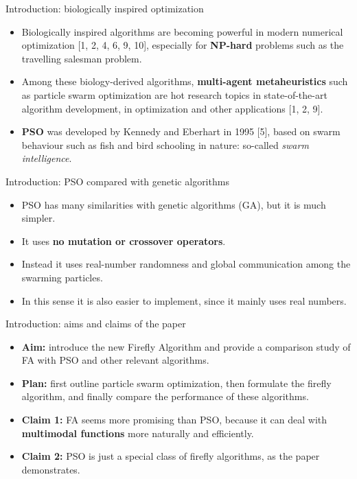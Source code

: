 \documentclass[aspectratio=169,11pt]{beamer}
\newcommand{\hdr}[1]{\gdef\curhdr{#1}}
\gdef\curhdr{}
\begin{document}
\hdr{1 Introduction}
\begin{frame}[t]{Introduction: biologically inspired optimization}
\begin{itemize}\itemsep0.7em
  \item Biologically inspired algorithms are becoming powerful in modern numerical optimization [1, 2, 4, 6, 9, 10], especially for \textbf{NP-hard} problems such as the travelling salesman problem.
  \item Among these biology-derived algorithms, \textbf{multi-agent metaheuristics} such as particle swarm optimization are hot research topics in state-of-the-art algorithm development, in optimization and other applications [1, 2, 9].
  \item \textbf{PSO} was developed by Kennedy and Eberhart in 1995 [5], based on swarm behaviour such as fish and bird schooling in nature: so-called \emph{swarm intelligence}.
\end{itemize}
\end{frame}

\begin{frame}[t]{Introduction: PSO compared with genetic algorithms}
\begin{itemize}\itemsep0.7em
  \item PSO has many similarities with genetic algorithms (GA), but it is much simpler.
  \item It uses \textbf{no mutation or crossover operators}.
  \item Instead it uses real-number randomness and global communication among the swarming particles.
  \item In this sense it is also easier to implement, since it mainly uses real numbers.
\end{itemize}
\end{frame}

\begin{frame}[t]{Introduction: aims and claims of the paper}
\begin{itemize}\itemsep0.7em
  \item \textbf{Aim:} introduce the new Firefly Algorithm and provide a comparison study of FA with PSO and other relevant algorithms.
  \item \textbf{Plan:} first outline particle swarm optimization, then formulate the firefly algorithm, and finally compare the performance of these algorithms.
  \item \textbf{Claim 1:} FA seems more promising than PSO, because it can deal with \textbf{multimodal functions} more naturally and efficiently.
  \item \textbf{Claim 2:} PSO is just a special class of firefly algorithms, as the paper demonstrates.
\end{itemize}
\end{frame}
\end{document}
